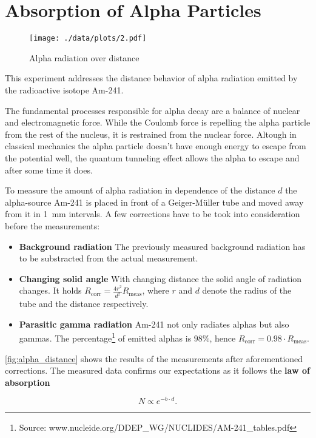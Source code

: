 \chapter{Absorption of Alpha Particles}
\begin{figure}[ht!]
	\centering
	\texttt{[image: ./data/plots/2.pdf]}
	\caption[Alpha radiation over distance]{Alpha radiation over distance}
	\label{fig:alpha_distance}
\end{figure}

This experiment addresses the distance behavior of alpha radiation emitted by the radioactive isotope Am-241.

The fundamental processes responsible for alpha decay are a balance of nuclear and electromagnetic force.
While the Coulomb force is repelling the alpha particle from the rest of the nucleus, it is restrained from the nuclear force.
Altough in classical mechanics the alpha particle doesn't have enough energy to escape from the potential well, the quantum tunneling effect allows the alpha to escape and after some time it does.

To measure the amount of alpha radiation in dependence of the distance $d$ the alpha-source Am-241 is placed in front of a Geiger-Müller tube and moved away from it in \SI{1}{\milli\meter} intervals.
A few corrections have to be took into consideration before the measurements:
\begin{itemize}
	\item \textbf{Background radiation} The previously measured background radiation has to be substracted from the actual measurement.
	\item \textbf{Changing solid angle} With changing distance the solid angle of radiation changes. It holds $R_\text{corr}=\frac{4r^2}{d^2}R_\text{meas}$, where $r$ and $d$ denote the radius of the tube and the distance respectively.
	\item \textbf{Parasitic gamma radiation} Am-241 not only radiates alphas but also gammas. The percentage\footnote{Source: www.nucleide.org/DDEP\_WG/NUCLIDES/AM-241\_tables.pdf} of emitted alphas is $\num{98}\%$, hence $R_\text{corr}=0.98\cdot R_\text{meas}$.
\end{itemize}

\autoref{fig:alpha_distance} shows the results of the measurements after aforementioned corrections.
The measured data confirms our expectations as it follows the \textbf{law of absorption}

\begin{equation*}
	N\propto e^{-b\cdot d}.
\end{equation*}

